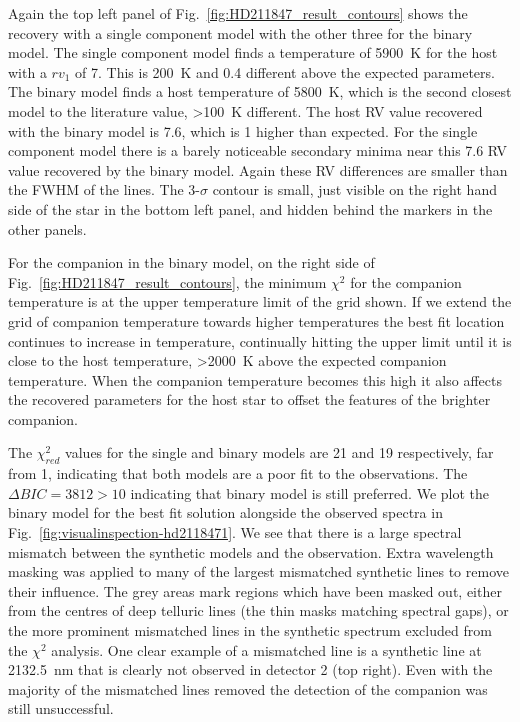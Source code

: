 Again the top left panel of Fig.~\ref{fig:HD211847_result_contours} shows the recovery with a single component model with the other three for the binary model. The single component model finds a temperature of 5900~K for the host with a \({rv}_1\) of 7\kmps{}. This is 200~K and 0.4\kmps{} different above the expected parameters. The binary model finds a host temperature of 5800~K, which is the second closest model to the literature value, >100~K different. The host RV value recovered with the binary model is 7.6\kmps{}, which is 1\kmps{} higher than expected.  For the single component model there is a barely noticeable secondary minima near this 7.6\kmps{} RV value recovered by the binary model. Again these RV differences are smaller than the FWHM of the lines. The 3-\(\sigma\) contour is small, just visible on the right hand side of the star in the bottom left panel, and hidden behind the markers in the other panels. 


For the companion in the binary model, on the right side of Fig.~\ref{fig:HD211847_result_contours}, the minimum \(\chi^2\) for the companion temperature is at the upper temperature limit of the grid shown. If we extend the grid of companion temperature towards higher temperatures the best fit location continues to increase in temperature, continually hitting the upper limit until it is close to the host temperature, >2000~K above the expected companion temperature. When the companion temperature becomes this high it also affects the recovered parameters for the host star to offset the features of the brighter companion. 

The \(\chi^2_{red}\) values for the single and binary models are 21 and 19 respectively, far from 1, indicating that both models are a poor fit to the observations. {\rd{} The $\Delta BIC = 3812 >10$ indicating that binary model is still preferred.} We plot the binary model for the best fit solution alongside the observed spectra in Fig.~\ref{fig:visualinspection-hd2118471}. We see that there is a large spectral mismatch between the synthetic models and the observation. Extra wavelength masking was applied to many of the largest mismatched synthetic lines to remove their influence. The grey areas mark regions which have been masked out, either from the centres of deep telluric lines (the thin masks matching spectral gaps), or the more prominent mismatched lines in the synthetic spectrum excluded from the \(\chi^2\) analysis. One clear example of a mismatched line is a synthetic line at 2132.5~nm that is clearly not observed in detector 2 (top right). Even with the majority of the mismatched lines removed the detection of the companion was still unsuccessful.

